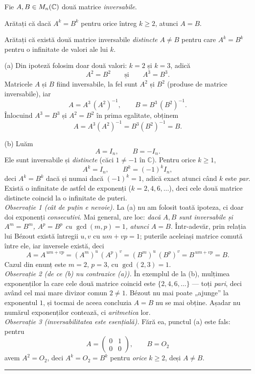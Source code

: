 Fie $A,B\in M_n(\mathbb{C})$ două matrice \emph{inversabile}.
\begin{parti}
  \item Arătați că dacă $A^k=B^k$ pentru orice întreg $k\ge2$, atunci $A=B$.
  \item Arătați că există două matrice inversabile \emph{distincte} $A\neq B$ pentru care $A^k=B^k$ pentru o infinitate de valori ale lui $k$.
\end{parti}
\sol (a) Din ipoteză folosim doar două valori: $k=2$ și $k=3$, adică
\[ A^2=B^2\qquad\text{și}\qquad A^3=B^3 . \]
Matricele $A$ și $B$ fiind inversabile, la fel sunt $A^2$ și $B^2$ (produse de matrice inversabile), iar
\[ A=A^3\,(A^2)^{-1},\qquad B=B^3\,(B^2)^{-1} . \]
Înlocuind $A^3=B^3$ și $A^2=B^2$ în prima egalitate, obținem
\[ A=A^3(A^2)^{-1}=B^3(B^2)^{-1}=B . \]

(b) Luăm
\[ A=I_n,\qquad B=-I_n . \]
Ele sunt inversabile și \emph{distincte} (căci $1\neq-1$ în $\mathbb{C}$). Pentru orice $k\ge1$,
\[ A^k=I_n,\qquad B^k=(-1)^k I_n , \]
deci $A^k=B^k$ dacă și numai dacă $(-1)^k=1$, adică exact atunci când $k$ este \emph{par}. Există o infinitate de astfel de exponenți ($k=2,4,6,\dots$), deci cele două matrice distincte coincid la o infinitate de puteri.\\[2pt]
\emph{Observație 1 (cât de puțin e nevoie).} La (a) nu am folosit toată ipoteza, ci doar doi exponenți \emph{consecutivi}. Mai general, are loc: \emph{dacă $A,B$ sunt inversabile și $A^m=B^m$, $A^p=B^p$ cu $\gcd(m,p)=1$, atunci $A=B$.} Într-adevăr, prin relația lui Bézout există întregii $u,v$ cu $um+vp=1$; puterile aceleiași matrice comută între ele, iar inversele există, deci
\[ A=A^{\,um+vp}=(A^m)^u\,(A^p)^v=(B^m)^u\,(B^p)^v=B^{\,um+vp}=B . \]
Cazul din enunț este $m=2$, $p=3$, cu $\gcd(2,3)=1$.\\[2pt]
\emph{Observație 2 (de ce (b) nu contrazice (a)).} În exemplul de la (b), mulțimea exponenților la care cele două matrice coincid este $\{2,4,6,\dots\}$ --- toți \emph{pari}, deci având cel mai mare divizor comun $2\neq1$. Bézout nu mai poate „ajunge'' la exponentul $1$, și tocmai de aceea concluzia $A=B$ nu se mai obține. Așadar nu numărul exponenților contează, ci \emph{aritmetica} lor.\\[2pt]
\emph{Observație 3 (inversabilitatea este esențială).} Fără ea, punctul (a) este fals: pentru
\[ A=\begin{pmatrix}0&1\\0&0\end{pmatrix},\qquad B=O_2 \]
avem $A^2=O_2$, deci $A^k=O_2=B^k$ pentru \emph{orice} $k\ge2$, deși $A\neq B$.
\vspace{1mm}\hrule

